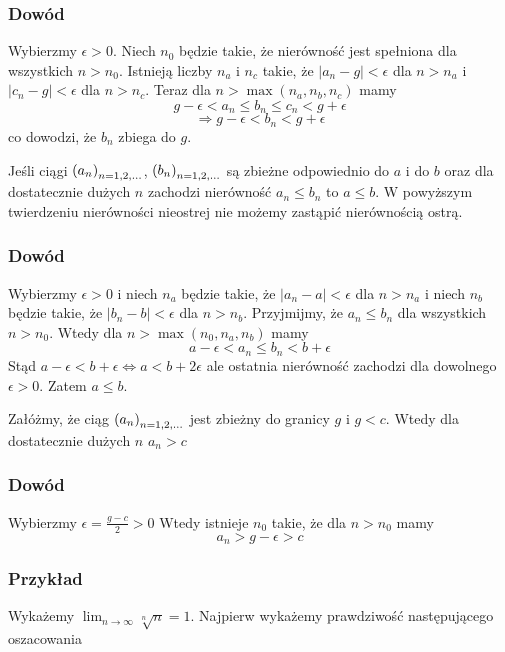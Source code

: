 \documentclass[9pt]{article}
\begin{document}
\subsubsection*{Dowód}
Wybierzmy $\epsilon > 0$. Niech $n_0$ będzie takie, że nierówność jest spełniona dla wszystkich $n >
n_0$. Istnieją liczby $n_a$ i $n_c$ takie, że $|a_n - g| < \epsilon$ dla $n > n_a$ i $|c_n - g| <
\epsilon$ dla $n > n_c$. Teraz dla $n > \max (n_a, n_b, n_c)$ mamy
\[
    g-\epsilon < a_n \le b_n \le c_n < g + \epsilon 
\]
\[
    \Rightarrow g-\epsilon < b_n < g+\epsilon
\]
co dowodzi, że $b_n$ zbiega do $g$.

\begin{Twi}
    Jeśli ciągi $\left(a_n\right)_{n = 1,2,...}$, $\left(b_n\right)_{n = 1,2,...}$ są zbieżne odpowiednio do $a$ i do $b$ oraz dla dostatecznie
    dużych $n$ zachodzi nierówność $a_n \le b_n$ to $a \le b$. W powyższym twierdzeniu nierówności
    nieostrej nie możemy zastąpić nierównością ostrą.
\end{Twi}

\subsubsection*{Dowód}
Wybierzmy $\epsilon > 0$ i niech $n_a$ będzie takie, że $|a_n - a| < \epsilon$ dla $n > n_a$ i niech
$n_b$ będzie takie, że $|b_n - b| < \epsilon$ dla $n > n_b$. Przyjmijmy, że $a_n \le b_n$ dla
wszystkich $n > n_0$. Wtedy dla $n > \max (n_0, n_a, n_b)$ mamy
\[
    a - \epsilon < a_n \le b_n < b + \epsilon
\]
Stąd $a - \epsilon < b+ \epsilon \iff a < b+2\epsilon$ ale ostatnia nierówność zachodzi dla
dowolnego $\epsilon > 0$. Zatem $a \le b$.

\begin{Twi}[O szacowaniu]
    Załóżmy, że ciąg $\left(a_n\right)_{n = 1,2,...}$ jest zbieżny do granicy $g$ i $g < c$. Wtedy dla dostatecznie
    dużych $n$ $a_n > c$
\end{Twi}

\subsubsection*{Dowód}
Wybierzmy $\epsilon = \frac{g-c}{2} > 0$ Wtedy istnieje $n_0$ takie, że dla $n > n_0$ mamy
\[
    a_n > g-\epsilon > c
\]

\subsubsection*{Przykład}

Wykażemy $\lim_{n \rightarrow \infty} \sqrt[n]{n} = 1$. Najpierw wykażemy prawdziwość następującego
oszacowania
\end{document}

